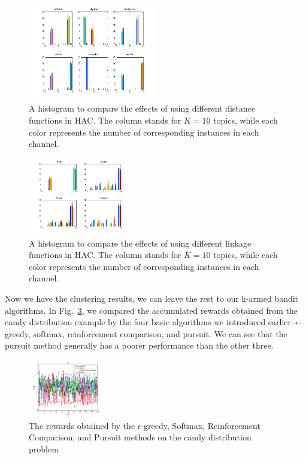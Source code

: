 \documentclass[conference]{IEEEtran}
\begin{document}
\begin{figure}
	\center	
	\includegraphics[width=0.5\textwidth]{fig/hac_dists.png}
	\caption{A histogram to compare the effects of using different distance functions in HAC. The column stands for $K=10$ topics, while each color represents the number of corresponding instances in each channel.}
	\label{hac_dists}
\end{figure}

\begin{figure}
	\center	
	\includegraphics[width=0.4\textwidth]{fig/hac_links.png}
	\caption{A histogram to compare the effects of using different linkage functions in HAC. The column stands for $K=10$ topics, while each color represents the number of corresponding instances in each channel.}
	\label{hac_links}
\end{figure}

Now we have the clustering results, we can leave the rest to our k-armed bandit algorithms. In Fig.~\ref{sutton_candy_r}, we compared the accumulated rewards obtained from the candy distribution example by the four basic algorithms we introduced earlier--$\epsilon$-greedy, softmax, reinforcement comparison, and pursuit. We can see that the pursuit method generally has a poorer performance than the other three. 

\begin{figure}
	\center	
	\includegraphics[width=0.3\textwidth]{fig/sutton_candy_r.png}
	\caption{The rewards obtained by the $\epsilon$-greedy, Softmax, Reinforcement Comparison, and Pursuit methods on the candy distribution problem}
	\label{sutton_candy_r}
\end{figure}
\end{document}
